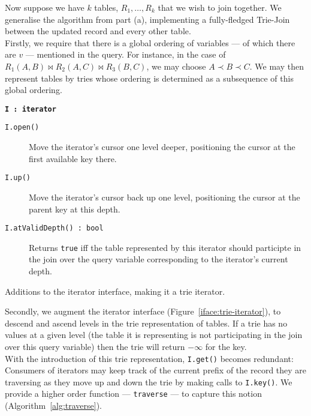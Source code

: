 Now suppose we have $k$ tables, $R_1,\ldots,R_k$ that we wish to join together. We generalise the algorithm from part (a), implementing a fully-fledged Trie-Join between the updated record and every other table.\\[1em]

Firstly, we require that there is a global ordering of variables --- of which there are $v$ --- mentioned in the query. For instance, in the case of $R_1(A,B)\bowtie R_2(A,C)\bowtie R_3(B,C)$, we may choose $A\prec B\prec C$. We may then represent tables by tries whose ordering is determined as a subsequence of this global ordering.\\[1em]

\begin{marginfigure}
  \textbf{\texttt{I\,:\,iterator}}
  \begin{description}
    \item[\texttt{I.open()}]
      Move the iterator's cursor one level deeper, positioning the cursor at the first available key there.
    \item[\texttt{I.up()}]
      Move the iterator's cursor back up one level, positioning the cursor at the parent key at this depth.
    \item[\texttt{I.atValidDepth()\,:\,bool}]
      Returns \texttt{true} iff the table represented by this iterator should participte in the join over the query variable corresponding to the iterator's current depth.
  \end{description}
  \caption{Additions to the iterator interface, making it a trie iterator.}\label{iface:trie-iterator}
\end{marginfigure}

Secondly, we augment the iterator interface (Figure~\ref{iface:trie-iterator}), to descend and ascend levels in the trie representation of tables\cite{DBLP:journals/corr/abs-1210-0481}. If a trie has no values at a given level (the table it is representing is not participating in the join over this query variable) then the trie will return $-\infty$ for the key.\\[1em]

With the introduction of this trie representation, \texttt{I.get()} becomes redundant: Consumers of iterators may keep track of the current prefix of the record they are traversing as they move up and down the trie by making calls to \texttt{I.key()}. We provide a higher order function --- \texttt{traverse} --- to capture this notion (Algorithm~\ref{alg:traverse}).\\[1em]


